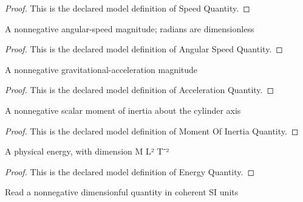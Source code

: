 \begin{proof}
  This is the declared model definition of Speed Quantity.
\end{proof}
\begin{definition}
  \label{def:physics:phyx-mini-0821:phyxminiproblems-problemphyxmini0821-angularspeedquantity}
  A nonnegative angular-speed magnitude; radians are dimensionless
\end{definition}
\begin{proof}
  This is the declared model definition of Angular Speed Quantity.
\end{proof}
\begin{definition}
  \label{def:physics:phyx-mini-0821:phyxminiproblems-problemphyxmini0821-accelerationquantity}
  A nonnegative gravitational-acceleration magnitude
\end{definition}
\begin{proof}
  This is the declared model definition of Acceleration Quantity.
\end{proof}
\begin{definition}
  \label{def:physics:phyx-mini-0821:phyxminiproblems-problemphyxmini0821-momentofinertiaquantity}
  A nonnegative scalar moment of inertia about the cylinder axis
\end{definition}
\begin{proof}
  This is the declared model definition of Moment Of Inertia Quantity.
\end{proof}
\begin{definition}
  \label{def:physics:phyx-mini-0821:phyxminiproblems-problemphyxmini0821-energyquantity}
  A physical energy, with dimension M L² T⁻²
\end{definition}
\begin{proof}
  This is the declared model definition of Energy Quantity.
\end{proof}
\begin{definition}
  \label{def:physics:phyx-mini-0821:phyxminiproblems-problemphyxmini0821-nonnegativesireadout}
  Read a nonnegative dimensionful quantity in coherent SI units
\end{definition}
